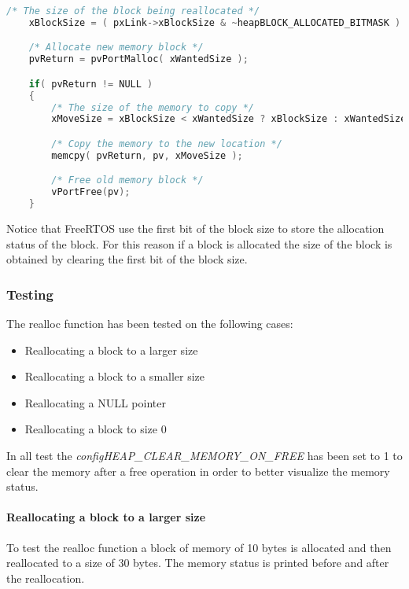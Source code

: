     \begin{codebox}
    \begin{lstlisting}[language=c]
    /* The size of the block being reallocated */
    xBlockSize = ( pxLink->xBlockSize & ~heapBLOCK_ALLOCATED_BITMASK ) - xHeapStructSize;

    /* Allocate new memory block */
    pvReturn = pvPortMalloc( xWantedSize );

    if( pvReturn != NULL )
    {
        /* The size of the memory to copy */
        xMoveSize = xBlockSize < xWantedSize ? xBlockSize : xWantedSize;

        /* Copy the memory to the new location */
        memcpy( pvReturn, pv, xMoveSize );

        /* Free old memory block */
        vPortFree(pv);
    } 
    \end{lstlisting}
    \end{codebox}

    Notice that FreeRTOS use the first bit of the block size to store the allocation status of the block. For this reason if a block is allocated the size of the block is obtained by clearing the first bit of the block size.

    \subsubsection{Testing}
    The realloc function has been tested on the following cases:

    \begin{itemize}
        \item Reallocating a block to a larger size
        \item Reallocating a block to a smaller size
        \item Reallocating a NULL pointer
        \item Reallocating a block to size 0
    \end{itemize}

    In all test the \textit{configHEAP\_CLEAR\_MEMORY\_ON\_FREE} has been set to 1 to clear the memory after a free operation in order to better visualize the memory status.

    \paragraph{Reallocating a block to a larger size}
    To test the realloc function a block of memory of 10 bytes is allocated and then reallocated to a size of 30 bytes. The memory status is printed before and after the reallocation.

